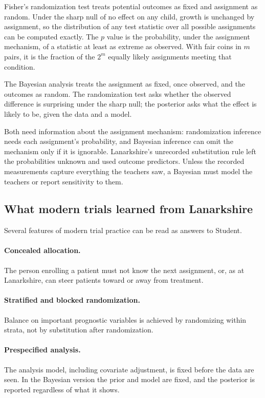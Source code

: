 Fisher's randomization test treats potential outcomes as fixed and assignment as random. Under the sharp null of no effect on any child, growth is unchanged by assignment, so the distribution of any test statistic over all possible assignments can be computed exactly. The $p$ value is the probability, under the assignment mechanism, of a statistic at least as extreme as observed. With fair coins in $m$ pairs, it is the fraction of the $2^m$ equally likely assignments meeting that condition.

The Bayesian analysis treats the assignment as fixed, once observed, and the outcomes as random. The randomization test asks whether the observed difference is surprising under the sharp null; the posterior asks what the effect is likely to be, given the data and a model.

Both need information about the assignment mechanism: randomization inference needs each assignment's probability, and Bayesian inference can omit the mechanism only if it is ignorable. Lanarkshire's unrecorded substitution rule left the probabilities unknown and used outcome predictors. Unless the recorded measurements capture everything the teachers saw, a Bayesian must model the teachers or report sensitivity to them.

\subsection{What modern trials learned from Lanarkshire}

Several features of modern trial practice can be read as answers to Student.

\paragraph{Concealed allocation.} The person enrolling a patient must not know the next assignment, or, as at Lanarkshire, can steer patients toward or away from treatment.

\paragraph{Stratified and blocked randomization.} Balance on important prognostic variables is achieved by randomizing within strata, not by substitution after randomization.

\paragraph{Prespecified analysis.} The analysis model, including covariate adjustment, is fixed before the data are seen. In the Bayesian version the prior and model are fixed, and the posterior is reported regardless of what it shows.

